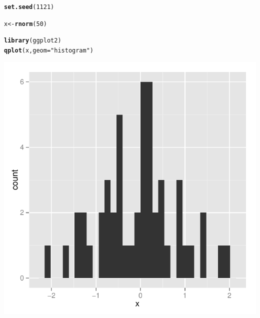 \documentclass{article}\usepackage[]{graphicx}\usepackage[]{color}
\makeatletter
\newcommand{\hlnum}[1]{\textcolor[rgb]{0.686,0.059,0.569}{#1}}%
\newcommand{\hlstr}[1]{\textcolor[rgb]{0.192,0.494,0.8}{#1}}%
\newcommand{\hlstd}[1]{\textcolor[rgb]{0.345,0.345,0.345}{#1}}%
\newcommand{\hlkwb}[1]{\textcolor[rgb]{0.69,0.353,0.396}{#1}}%
\newcommand{\hlkwc}[1]{\textcolor[rgb]{0.333,0.667,0.333}{#1}}%
\newcommand{\hlkwd}[1]{\textcolor[rgb]{0.737,0.353,0.396}{\textbf{#1}}}%
\newenvironment{kframe}{%
 \def\at@end@of@kframe{}%
 \ifinner\ifhmode%
  \def\at@end@of@kframe{\end{minipage}}%
  \begin{minipage}{\columnwidth}%
 \fi\fi%
 \def\FrameCommand##1{\hskip\@totalleftmargin \hskip-\fboxsep
 \colorbox{shadecolor}{##1}\hskip-\fboxsep
     \hskip-\linewidth \hskip-\@totalleftmargin \hskip\columnwidth}%
 \MakeFramed {\advance\hsize-\width
   \@totalleftmargin\z@ \linewidth\hsize
   \@setminipage}}%
 {\par\unskip\endMakeFramed%
 \at@end@of@kframe}
\newenvironment{knitrout}{}{} %
\makeatother
\begin{document}
\begin{knitrout}
\color{fgcolor}\begin{kframe}
\begin{alltt}
\hlkwd{set.seed}\hlstd{(}\hlnum{1121}\hlstd{)}

\hlstd{x} \hlkwb{<-} \hlkwd{rnorm}\hlstd{(}\hlnum{50}\hlstd{)}

\hlkwd{library}\hlstd{(ggplot2)}
\hlkwd{qplot}\hlstd{(x,} \hlkwc{geom} \hlstd{=} \hlstr{"histogram"}\hlstd{)}
\end{alltt}


{\ttfamily\noindent\itshape\color{messagecolor}{\#\# stat\_bin: binwidth defaulted to range/30. Use 'binwidth = x' to adjust this.}}\end{kframe}

{\centering \includegraphics[width=\textwidth]{figure/pretty-histogram1} 

}



\end{knitrout}

\clearpage
\end{document}

